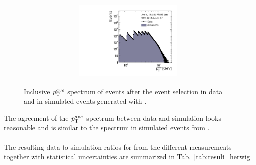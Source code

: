 \begin{figure}[!hp]
  \centering
  \begin{tabular}{c}
                \includegraphics[width=0.49\textwidth]{figures/HerwigPtAve__AfterAsymmHistos.pdf}
  \end{tabular}
  \caption{Inclusive $p_{\text{T}}^{ave}$ spectrum of events after the event selection in data and in simulated events generated with \herwig.}
  \label{fig:control_plots_herwig}
\end{figure}
The agreement of the $p_{\text{T}}^{ave}$ spectrum between data and simulation looks reasonable and is similar to the spectrum in simulated events from \pythia.\\
\\ 
The resulting data-to-simulation ratios for \herwig from the different measurements together with statistical uncertainties are summarized in Tab.~\ref{tab:result_herwig} 
